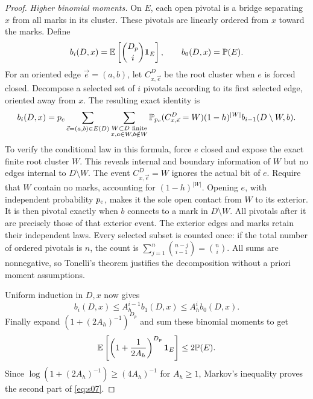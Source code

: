 \begin{proof}
\emph{Higher binomial moments.}
On $E$, each open pivotal is a bridge separating $x$ from all marks
in its cluster. These pivotals are linearly ordered from $x$ toward
the marks. Define
\[
 b_i(D,x)=\mathbb E\left[\binom{D_p}{i}\mathbf 1_E\right],
 \qquad b_0(D,x)=\mathbb P(E).
\]
For an oriented edge $\vec e=(a,b)$, let $C_{x,\vec e}^D$ be the
root cluster when $e$ is forced closed. Decompose a selected set of
$i$ pivotals according to its first selected edge, oriented away
from $x$. The resulting exact identity is
\begin{equation}\label{good:pivotal-recursion}
 b_i(D,x)={p_c}\sum_{\vec e=(a,b)\in E(D)}
 \sum_{\substack{W\subset D\text{ finite}\\x,a\in W, b\notin W}}
 \mathbb P_{p_c}(C_{x,\vec e}^D=W)(1-h)^{|W|}
 b_{i-1}(D\setminus W,b).
\end{equation}
To verify the conditional law in this formula, force $e$ closed and
expose the exact finite root cluster $W$. This reveals internal and
boundary information of $W$ but no edges internal to $D\setminus W$.
The event $C_{x,\vec e}^D=W$ ignores the actual bit of $e$.
Require that $W$ contain no marks, accounting for $(1-h)^{|W|}$.
Opening $e$, with independent probability ${p_c}$, makes it the sole
open contact from $W$ to its exterior. It is then pivotal exactly
when $b$ connects to a mark in $D\setminus W$. All pivotals after
it are precisely those of that exterior event. The exterior edges
and marks retain their independent laws. Every selected subset is
counted once: if the total number of ordered pivotals is $n$, the
count is $\sum_{j=1}^n\binom{n-j}{i-1}=\binom ni$.
All sums are nonnegative, so Tonelli's theorem justifies the
decomposition without a priori moment assumptions.

Uniform induction in $D,x$ now gives
\[
 b_i(D,x)\le A_h^{i-1}b_1(D,x)\le A_h^ib_0(D,x).
\]
Finally expand $(1+(2A_h)^{-1})^{D_p}$ and sum these binomial
moments to get
\[
 \mathbb E\left[\left(1+\frac1{2A_h}\right)^{D_p}\mathbf 1_E\right]
 \le2\mathbb P(E).
\]
Since $\log(1+(2A_h)^{-1})\ge(4A_h)^{-1}$ for $A_h\ge1$,
Markov's inequality proves the second part of \eqref{eq:s07}.
\end{proof}

